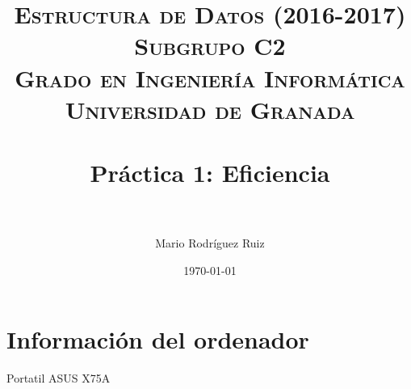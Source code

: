


\title{	
\normalfont \normalsize 
\textsc{\textbf{Estructura de Datos (2016-2017)} \\ Subgrupo C2 \\ Grado en Ingeniería Informática\\ Universidad de Granada} \\ [25pt] %
\horrule{0.5pt} \\[0.4cm] %
\huge Práctica 1: Eficiencia \\ %
\horrule{2pt} \\[0.5cm] %
}

\author{Mario Rodríguez Ruiz} %

\date{\normalsize\today} %




\maketitle %

\newpage %

\tableofcontents %

\listoffigures

\listoftables

\newpage


\section{Información del ordenador}

Portatil ASUS X75A



